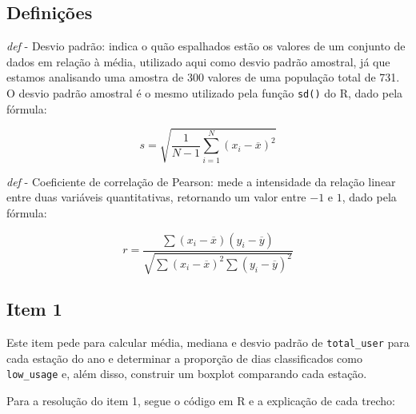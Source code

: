 \documentclass[a4paper, 12pt, titlepage]{article}
\begin{document}

\subsection*{Definições}
\noindent \textit{def} - Desvio padrão: indica o quão espalhados estão os valores de um conjunto de dados em relação à média, utilizado aqui como desvio padrão amostral, já que estamos analisando uma amostra de 300 valores de uma população total de 731. O desvio padrão amostral é o mesmo utilizado pela função \texttt{sd()} do R, dado pela fórmula:

\begin{equation*}
    s = \sqrt{\frac{1}{N-1}\sum_{i=1}^{N}\left(x_i-\overline{x}\right)^2}
\end{equation*}

\noindent \textit{def} - Coeficiente de correlação de Pearson: mede a intensidade da relação linear entre duas variáveis quantitativas, retornando um valor entre $-1$ e $1$, dado pela fórmula:

\begin{equation*}
    r = \frac{\sum\left(x_i-\overline{x}\right)\left(y_i-\overline{y}\right)}{\sqrt{\sum\left(x_i-\overline{x}\right)^2\sum\left(y_i-\overline{y}\right)^2}}
\end{equation*}


\subsection*{Item 1}
Este item pede para calcular média, mediana e desvio padrão de \texttt{total\_user} para cada estação do ano e determinar a proporção de dias classificados como \texttt{low\_usage} e, além disso, construir um boxplot comparando cada estação.

Para a resolução do item 1, segue o código em R e a explicação de cada trecho:
\end{document}
